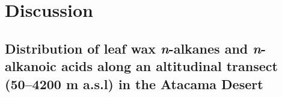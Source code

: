 \documentclass[
  authoryear,
  preprint,
  3p]{elsarticle}
\begin{document}
\hypertarget{discussion}{%
\section{Discussion}\label{discussion}}

\hypertarget{distribution-of-leaf-wax-n-alkanes-and-n-alkanoic-acids-along-an-altitudinal-transect-504200-m-a.s.l-in-the-atacama-desert}{%
\subsection{\texorpdfstring{Distribution of leaf wax \emph{n}-alkanes
and \emph{n}-alkanoic acids along an altitudinal transect (50--4200 m
a.s.l) in the Atacama
Desert}{Distribution of leaf wax n-alkanes and n-alkanoic acids along an altitudinal transect (50--4200 m a.s.l) in the Atacama Desert}}\label{distribution-of-leaf-wax-n-alkanes-and-n-alkanoic-acids-along-an-altitudinal-transect-504200-m-a.s.l-in-the-atacama-desert}}
\end{document}
